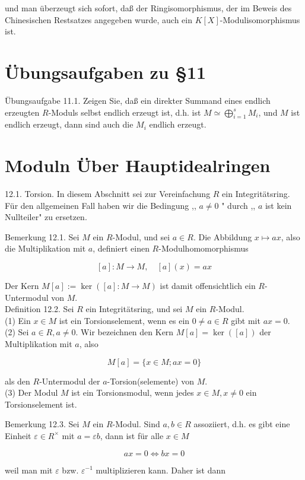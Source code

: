 \documentclass[10pt, letterpaper]{article}
\begin{document}
und man überzeugt sich sofort, daß der Ringisomorphismus, der im Beweis des Chinesischen Restsatzes angegeben wurde, auch ein $K[X]$-Modulisomorphismus ist.

\section*{Übungsaufgaben zu §11}
Übungsaufgabe 11.1. Zeigen Sie, daß ein direkter Summand eines endlich erzeugten $R$-Moduls selbst endlich erzeugt ist, d.h. ist $M \simeq \bigoplus_{i=1}^{s} M_{i}$, und $M$ ist endlich erzeugt, dann sind auch die $M_{i}$ endlich erzeugt.

\section*{Moduln Über Hauptidealringen}
12.1. Torsion. In diesem Abschnitt sei zur Vereinfachung $R$ ein Integritätsring. Für den allgemeinen Fall haben wir die Bedingung ,, $a \neq 0$ " durch ,, $a$ ist kein Nullteiler" zu ersetzen.

Bemerkung 12.1. Sei $M$ ein $R$-Modul, und sei $a \in R$. Die Abbildung $x \mapsto a x$, also die Multiplikation mit $a$, definiert einen $R$-Modulhomomorphismus

$$
[a]: M \rightarrow M, \quad[a](x)=a x
$$

Der Kern $M[a]:=\operatorname{ker}([a]: M \rightarrow M)$ ist damit offensichtlich ein $R$-Untermodul von $M$.\\
Definition 12.2. Sei $R$ ein Integritätsring, und sei $M$ ein $R$-Modul.\\
(1) Ein $x \in M$ ist ein Torsionselement, wenn es ein $0 \neq a \in R$ gibt mit $a x=0$.\\
(2) Sei $a \in R, a \neq 0$. Wir bezeichnen den Kern $M[a]=\operatorname{ker}([a])$ der Multiplikation mit $a$, also

$$
M[a]=\{x \in M ; a x=0\}
$$

als den $R$-Untermodul der $a$-Torsion(selemente) von $M$.\\
(3) Der Modul $M$ ist ein Torsionsmodul, wenn jedes $x \in M, x \neq 0$ ein Torsionselement ist.

Bemerkung 12.3. Sei $M$ ein $R$-Modul. Sind $a, b \in R$ assoziiert, d.h. es gibt eine Einheit $\varepsilon \in R^{\times}$ mit $a=\varepsilon b$, dann ist für alle $x \in M$

$$
a x=0 \Longleftrightarrow b x=0
$$

weil man mit $\varepsilon$ bzw. $\varepsilon^{-1}$ multiplizieren kann. Daher ist dann
\end{document}
